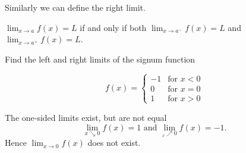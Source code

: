 \documentclass[../calc1-main.tex]{subfiles}
\begin{document}
  Similarly we can define the right limit.

  \begin{theorem}
    $\lim_{x \to a} f(x) = L$ if and only if both $\lim_{x \to a^{-}} f(x) =L$ and $\lim_{x \to a^{+}} f(x) = L$.
  \end{theorem}

  \begin{example}
    Find the left and right limits of the signum function

    \begin{minipage}[c]{0.5\textwidth}
      \[
        f(x) =
        \begin{cases}
          -1 & \text{for $x<0$}\\ 0 & \text{for $x=0$}\\ 1 & \text{for $x>0$}
        \end{cases}
      \]
    \end{minipage}
    \begin{minipage}[c]{0.2\textwidth}
      \begin{figure}[H]
        \centering
        
      \end{figure}
    \end{minipage}
  \end{example}
  \begin{solution}
    The one-sided limits exist, but are not equal
    \[
      \lim_{x\searrow0}f(x) = 1 \text{ and } \lim_{_x\nearrow0}f(x) = -1.
    \]
    Hence $\lim_{x\to 0} f(x)$ does not exist.
  \end{solution}


%   

\end{document}

